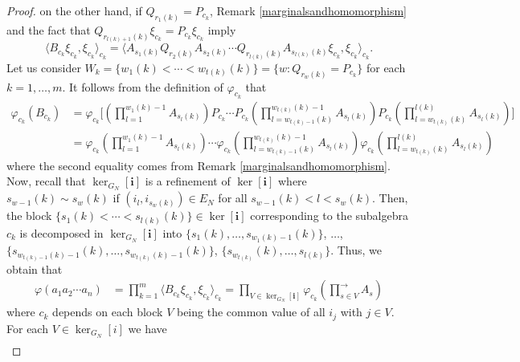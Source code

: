 \documentclass[a4paper,12pt]{extarticle}
\theoremstyle{definition}
\theoremstyle{remark}
\begin{document}
\begin{proof}
	on the other hand, if $Q_{r_1(k)}=P_{c_k}$, Remark \ref{marginalsandhomomorphism} and the fact that $Q_{r_{l(k)+1}(k)} \xi_{c_k}=P_{c_k}\xi_{c_k}$ imply 
	\[ \langle B_{c_k} \xi_{c_k},\xi_{c_k}\rangle_{c_k}=\langle A_{s_1(k)}Q_{r_2(k)}A_{s_2(k)}\cdots Q_{r_{l(k)}(k)}A_{s_{l(k)}(k)} \xi_{c_k},\xi_{c_k}\rangle_{c_k}.\]
	Let us consider $W_k=\{w_1(k)<\cdots<w_{t(k)}(k)\}=\{w: Q_{r_w(k)}=P_{c_k}\}$ for each $k=1,\ldots,m$. 
	It follows from the definition of $\varphi_{c_k}$ that
	\begin{align*}
		\varphi_{c_k}(B_{c_k})&=\varphi_{c_k}\bigg[\left(\prod_{l=1}^{w_1(k)-1}A_{s_l(k)}\right)P_{c_k}\cdots P_{c_k} \left(\prod_{l=w_{t(k)-1}(k)}^{w_{t(k)}(k)-1}A_{s_l(k)}\right)P_{c_k} \left(\prod_{l=w_{t(k)}(k)}^{l(k)} A_{s_l(k)}\right)\bigg]\\
		&=\varphi_{c_k}\left(\prod_{l=1}^{w_1(k)-1}A_{s_l(k)}\right)
		\cdots \varphi_{c_k} \left(\prod_{l=w_{t(k)-1}(k)}^{w_{t(k)}(k)-1}A_{s_l(k)}\right)\varphi_{c_k} \left(\prod_{l=w_{t(k)}(k)}^{l(k)} A_{s_l(k)}\right)
	\end{align*}
	where the second equality comes from Remark \ref{marginalsandhomomorphism}.
	Now, recall that $\ker_{G_N}[\bm{i}]$ is a refinement of $\ker[\bm{i}]$ where $s_{w-1}(k)\sim s_{w}(k)$ if $(i_l,i_{s_w(k)})\in E_N$ for all $s_{w-1}(k)<l<s_w(k)$. 
	Then, the block $\{s_1(k)<\cdots<s_{l(k)}(k)\}\in \ker[\bm{i}]$ corresponding to the subalgebra $c_k$ is decomposed in $\ker_{G_N}[\bm{i}]$ into $\{s_{1}(k),\ldots,s_{w_1(k)-1}(k)\}$, $\ldots$, $\{s_{w_{t(k)-1}(k)-1}(k),\ldots,s_{w_{t(k)}(k)-1}(k)\}$, $\{s_{w_{t(k)}}(k),\ldots,s_{l(k)}\}$. 
	Thus, we obtain that
	\begin{align*}
		\varphi(a_1a_2\cdots a_n)&=\prod_{k=1}^m \langle B_{c_k}\xi_{c_k},\xi_{c_k}\rangle_{c_k}=\prod_{V\in \ker_{G_N}[\bm{i}]}  \varphi_{c_k}\left(\prod_{s\in V}^{\rightarrow } A_s\right)
	\end{align*}
	where $c_k$ depends on each block $V$ being the common value of all $i_j$ with $j\in V$. 
	For each $V\in \ker_{G_N}[i]$ we have 
	\begin{align*}

\end{align*}
\end{proof}
\end{document}
